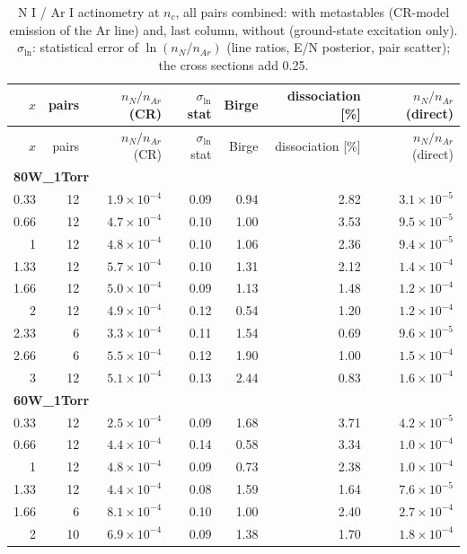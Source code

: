 \begin{longtable}{rrrrrrr}
\caption{N I / Ar I actinometry at $n_c$, all pairs combined: with metastables (CR-model emission of the Ar line) and, last column, without (ground-state excitation only). $\sigma_{\ln}$: statistical error of $\ln(n_N/n_{Ar})$ (line ratios, E/N posterior, pair scatter); the cross sections add 0.25.}\label{tab:actinometry}\\
\toprule $x$ & pairs & $n_N/n_{Ar}$ (CR) & $\sigma_{\ln}$ stat & Birge & dissociation [\%] & $n_N/n_{Ar}$ (direct) \\ \endfirsthead
\toprule $x$ & pairs & $n_N/n_{Ar}$ (CR) & $\sigma_{\ln}$ stat & Birge & dissociation [\%] & $n_N/n_{Ar}$ (direct) \\ \endhead
\midrule\multicolumn{7}{l}{\textbf{80W\_1Torr}}\\
0.33 & 12 & $1.9\times10^{-4}$ & 0.09 & 0.94 & 2.82 & $3.1\times10^{-5}$ \\
0.66 & 12 & $4.7\times10^{-4}$ & 0.10 & 1.00 & 3.53 & $9.5\times10^{-5}$ \\
1 & 12 & $4.8\times10^{-4}$ & 0.10 & 1.06 & 2.36 & $9.4\times10^{-5}$ \\
1.33 & 12 & $5.7\times10^{-4}$ & 0.10 & 1.31 & 2.12 & $1.4\times10^{-4}$ \\
1.66 & 12 & $5.0\times10^{-4}$ & 0.09 & 1.13 & 1.48 & $1.2\times10^{-4}$ \\
2 & 12 & $4.9\times10^{-4}$ & 0.12 & 0.54 & 1.20 & $1.2\times10^{-4}$ \\
2.33 & 6 & $3.3\times10^{-4}$ & 0.11 & 1.54 & 0.69 & $9.6\times10^{-5}$ \\
2.66 & 6 & $5.5\times10^{-4}$ & 0.12 & 1.90 & 1.00 & $1.5\times10^{-4}$ \\
3 & 12 & $5.1\times10^{-4}$ & 0.13 & 2.44 & 0.83 & $1.6\times10^{-4}$ \\
\midrule\multicolumn{7}{l}{\textbf{60W\_1Torr}}\\
0.33 & 12 & $2.5\times10^{-4}$ & 0.09 & 1.68 & 3.71 & $4.2\times10^{-5}$ \\
0.66 & 12 & $4.4\times10^{-4}$ & 0.14 & 0.58 & 3.34 & $1.0\times10^{-4}$ \\
1 & 12 & $4.8\times10^{-4}$ & 0.09 & 0.73 & 2.38 & $1.0\times10^{-4}$ \\
1.33 & 12 & $4.4\times10^{-4}$ & 0.08 & 1.59 & 1.64 & $7.6\times10^{-5}$ \\
1.66 & 6 & $8.1\times10^{-4}$ & 0.10 & 1.00 & 2.40 & $2.7\times10^{-4}$ \\
2 & 10 & $6.9\times10^{-4}$ & 0.09 & 1.38 & 1.70 & $1.8\times10^{-4}$ \\

\end{longtable}
